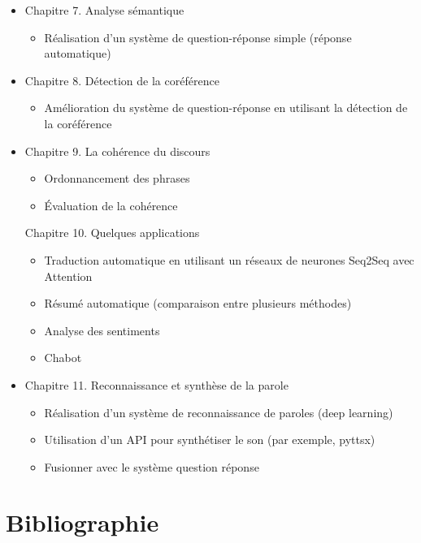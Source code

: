 \documentclass[11pt, a4paper]{article}
\begin{document}
\begin{itemize}
	\item Chapitre 7. Analyse sémantique
	\begin{itemize}
		\item Réalisation d'un système de question-réponse simple (réponse automatique)
	\end{itemize}

	\item Chapitre 8. Détection de la coréférence
	\begin{itemize}
		\item Amélioration du système de question-réponse en utilisant la détection de la coréférence
	\end{itemize}

	\item Chapitre 9. La cohérence du discours
	\begin{itemize}
		\item Ordonnancement des phrases
		\item Évaluation de la cohérence
	\end{itemize}

	Chapitre 10. Quelques applications
	\begin{itemize}
		\item Traduction automatique en utilisant un réseaux de neurones Seq2Seq avec Attention
		\item Résumé automatique (comparaison entre plusieurs méthodes)
		\item Analyse des sentiments 
		\item Chabot 
	\end{itemize}
	\item Chapitre 11. Reconnaissance et synthèse de la parole
	\begin{itemize}
		\item Réalisation d'un système de reconnaissance de paroles (deep learning)
		\item Utilisation d'un API pour synthétiser le son (par exemple, pyttsx)
		\item Fusionner avec le système question réponse
	\end{itemize}

\end{itemize}

%
%

\section{Bibliographie}

\nocite{*}

%


\end{document}
